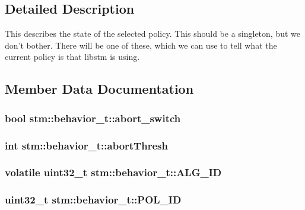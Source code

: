 \subsection{Detailed Description}
This describes the state of the selected policy. This should be a singleton, but we don't bother. There will be one of these, which we can use to tell what the current policy is that libstm is using. 

\subsection{Member Data Documentation}
\hypertarget{structstm_1_1behavior__t_a246c606cffbe6e00ad47817cca8b44f2}{
\subsubsection[{abort\-\_\-switch}]{\setlength{\rightskip}{0pt plus 5cm}bool stm\-::behavior\-\_\-t\-::abort\-\_\-switch}}\label{structstm_1_1behavior__t_a246c606cffbe6e00ad47817cca8b44f2}
\hypertarget{structstm_1_1behavior__t_ad54029ebe2d83e4ba76f1e011ed8f95e}{
\subsubsection[{abort\-Thresh}]{\setlength{\rightskip}{0pt plus 5cm}int stm\-::behavior\-\_\-t\-::abort\-Thresh}}\label{structstm_1_1behavior__t_ad54029ebe2d83e4ba76f1e011ed8f95e}
\hypertarget{structstm_1_1behavior__t_a52f3d6d903327aa9b96b4358c301b906}{
\subsubsection[{A\-L\-G\-\_\-\-I\-D}]{\setlength{\rightskip}{0pt plus 5cm}volatile uint32\-\_\-t stm\-::behavior\-\_\-t\-::\-A\-L\-G\-\_\-\-I\-D}}\label{structstm_1_1behavior__t_a52f3d6d903327aa9b96b4358c301b906}
\hypertarget{structstm_1_1behavior__t_aef57c4f5438b332ed2829a907101504f}{
\subsubsection[{P\-O\-L\-\_\-\-I\-D}]{\setlength{\rightskip}{0pt plus 5cm}uint32\-\_\-t stm\-::behavior\-\_\-t\-::\-P\-O\-L\-\_\-\-I\-D}}\label{structstm_1_1behavior__t_aef57c4f5438b332ed2829a907101504f}
